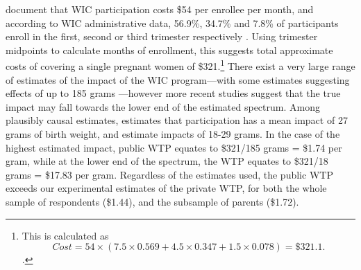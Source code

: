 \documentclass[a4paper, 11pt]{article}
\begin{document}
\begin{spacing}{1.4}
\citet{BenShalometal2011} document that WIC participation costs
\$54 per enrollee per month, and according to WIC administrative
data, 56.9\%, 34.7\% and 7.8\% of participants enroll in the first,
second or third trimester respectively \citep{Johnsonetal2013}.  Using trimester midpoints
to calculate months of enrollment, this suggests total approximate
costs of covering a single pregnant women of \$321.\footnote{This
  is calculated
  as \[
  Cost = 54\times (7.5\times0.569+4.5\times0.347+1.5\times0.078) = \$321.1.
  \].}
There exist a very large range of estimates of the impact of the WIC
program---with some estimates suggesting effects of up to 185 grams
\citep{KowaleskiJonesDuncan2011}---however more recent studies suggest
that the true impact may fall towards the lower end of the estimated
spectrum.  Among plausibly causal estimates, \citet{RossinSlater2013}
estimates that participation has a mean impact of 27 grams of birth weight,
and \citet{Hoynesetal2011} estimate impacts of 18-29 grams. In the case of
the highest estimated impact, public
WTP equates to \$321/185 grams = \$1.74 per gram, while at the lower
end of the spectrum, the WTP equates to \$321/18 grams = \$17.83 per gram. Regardless of the estimates used, the public WTP exceeds our experimental estimates of the private WTP, for both the whole sample of respondents (\$1.44), and the subsample of parents (\$1.72).



\end{spacing}
\end{document}
